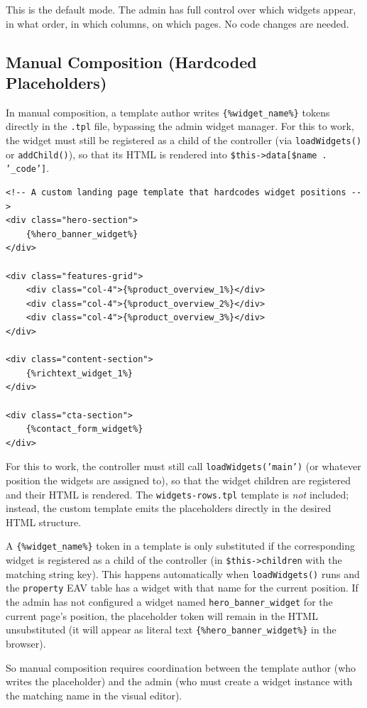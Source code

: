 \documentclass[11pt,a4paper]{article}
\begin{document}
This is the default mode. The admin has full control over which widgets
appear, in what order, in which columns, on which pages. No code changes
are needed.

\subsection{Manual Composition (Hardcoded Placeholders)}

In manual composition, a template author writes
\texttt{\{\%widget\_name\%\}} tokens directly in the \texttt{.tpl} file,
bypassing the admin widget manager. For this to work, the widget must
still be registered as a child of the controller (via
\texttt{loadWidgets()} or \texttt{addChild()}), so that its HTML is
rendered into \texttt{\$this->data[\$name . '\_code']}.

\begin{lstlisting}[caption={Manual widget placeholder hardcoding in a custom template.},label={lst:manual-hardcode}]
<!-- A custom landing page template that hardcodes widget positions -->
<div class="hero-section">
    {%hero_banner_widget%}
</div>

<div class="features-grid">
    <div class="col-4">{%product_overview_1%}</div>
    <div class="col-4">{%product_overview_2%}</div>
    <div class="col-4">{%product_overview_3%}</div>
</div>

<div class="content-section">
    {%richtext_widget_1%}
</div>

<div class="cta-section">
    {%contact_form_widget%}
</div>
\end{lstlisting}

For this to work, the controller must still call
\texttt{loadWidgets('main')} (or whatever position the widgets are
assigned to), so that the widget children are registered and their HTML
is rendered. The \texttt{widgets-rows.tpl} template is \emph{not}
included; instead, the custom template emits the placeholders directly
in the desired HTML structure.

\begin{findingbox}
A \texttt{\{\%widget\_name\%\}} token in a template is only substituted
if the corresponding widget is registered as a child of the controller
(in \texttt{\$this->children} with the matching string key). This
happens automatically when \texttt{loadWidgets()} runs and the
\texttt{property} EAV table has a widget with that name for the current
position. If the admin has not configured a widget named
\texttt{hero\_banner\_widget} for the current page's position, the
placeholder token will remain in the HTML unsubstituted (it will appear
as literal text \texttt{\{\%hero\_banner\_widget\%\}} in the browser).

So manual composition requires coordination between the template author
(who writes the placeholder) and the admin (who must create a widget
instance with the matching name in the visual editor).
\end{findingbox}
\end{document}
